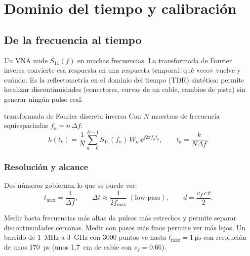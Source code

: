\chapter{Dominio del tiempo y calibración}

\section{De la frecuencia al tiempo}

Un VNA mide $S_{11}(f)$ en muchas frecuencias. La transformada de Fourier inversa convierte esa respuesta en una respuesta temporal:
qué «eco» vuelve y cuándo. Es la reflectometría en el dominio del tiempo (TDR) sintética: permite localizar discontinuidades
(conectores, curvas de un cable, cambios de pista) sin generar ningún pulso real.

\begin{definicion}{transformada de Fourier discreta inversa}
Con $N$ muestras de frecuencia equiespaciadas $f_n = n\,\Delta f$:
\begin{equation}
  h(t_k) = \frac{1}{N}\sum_{n=0}^{N-1} S_{11}(f_n)\,W_n\,\ee^{\jj 2\pi f_n t_k}, \qquad t_k = \frac{k}{N\Delta f}.
\end{equation}
\begin{donde}
\end{donde}
\end{definicion}

\subsection{Resolución y alcance}
Dos números gobiernan lo que se puede ver:
\begin{equation}
  t_{\max} = \frac{1}{\Delta f}, \qquad \Delta t \approx \frac{1}{2 f_{\max}} \;(\text{low-pass}), \qquad
  d = \frac{v_f\,c\,t}{2}.
\end{equation}
\begin{donde}
\end{donde}
\begin{intuicion}
Medir hasta frecuencias más altas da pulsos más estrechos y permite separar discontinuidades cercanas. Medir con pasos más finos permite
ver más lejos. Un barrido de \SI{1}{\mega\hertz} a \SI{3}{\giga\hertz} con 3000 puntos ve hasta $t_{\max} = \SI{1}{\micro\second}$ con resolución
de unos \SI{170}{\pico\second} (unos \SI{1.7}{\centi\metre} de cable con $v_f=0.66$).
\end{intuicion}

